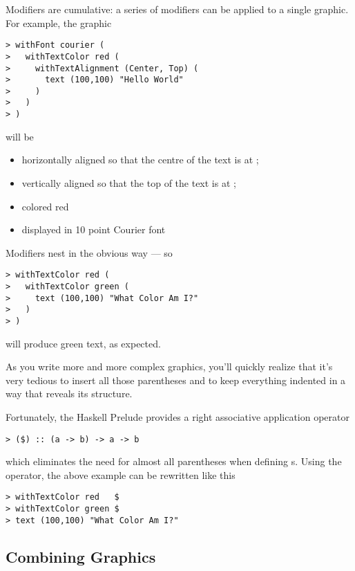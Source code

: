 Modifiers are cumulative: a series of modifiers can be applied to a
single graphic.  For example, the graphic
  
\begin{verbatim}
> withFont courier (
>   withTextColor red (
>     withTextAlignment (Center, Top) (
>       text (100,100) "Hello World"
>     )
>   )
> )
\end{verbatim}

will be 
%
\begin{itemize}
\itemsep0pt
\item horizontally aligned
  so that the centre of the text is at ;

\item vertically aligned
  so that the top of the text is at ;

\item colored red

\item displayed in 10 point Courier font

\end{itemize}

Modifiers nest in the obvious way --- so 
%
\begin{verbatim}
> withTextColor red (
>   withTextColor green (
>     text (100,100) "What Color Am I?"
>   )
> )
\end{verbatim}
%
will produce green text, as expected.

\begin{aside}
As you write more and more complex graphics, you'll quickly realize
that it's very tedious to insert all those parentheses and to keep
everything indented in a way that reveals its structure.

Fortunately, the Haskell Prelude provides a right associative 
application operator
%
\begin{verbatim}
> ($) :: (a -> b) -> a -> b
\end{verbatim}
%
which eliminates the need for almost all parentheses when defining
s.  Using the \fun{(\$)} operator, the above example can
be rewritten like this
%
\begin{verbatim}
> withTextColor red   $
> withTextColor green $
> text (100,100) "What Color Am I?"
\end{verbatim}
%

\end{aside}

\subsection{Combining Graphics}\label{combining}

